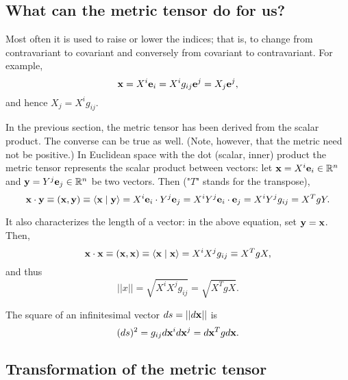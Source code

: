 \subsection{What can the metric tensor do for us?}

Most often it is used to raise or lower the indices; that is,
to change from contravariant to covariant and conversely from covariant
to contravariant.
{
\color{blue}
\bexample
For example,
\begin{equation}
{\bf x} =
X^i {\bf e}_i = X^i g_{ij} {\bf e}^j   = X_j {\bf e}^j,
\end{equation}
and hence $X_j = X^i g_{ij}$.
\eexample
}


In the previous section, the metric tensor has been derived from the scalar product.
The converse can be true as well.
(Note, however, that the metric need not be positive.)
In Euclidean space with the dot (scalar, inner) product
the metric tensor represents the scalar product between vectors: let
${\bf x}=X^i{\bf e}_i \in {\Bbb R}^n$ and ${\bf y}=Y^j{\bf e}_j \in {\Bbb R}^n$ be two vectors.
Then ("$T$" stands for the transpose),
\begin{equation}
{\bf x}\cdot {\bf y}\equiv ({\bf x},{\bf y})\equiv \langle {\bf x}\mid {\bf y}\rangle
= X^i {\bf e}_i\cdot Y^j {\bf e}_j
= X^iY^j {\bf e}_i\cdot  {\bf e}_j
=X^iY^j g_{ij}= X^T g Y.
\end{equation}

It also characterizes the length of a vector: in the above
equation, set ${\bf y}={\bf x}$. Then,
\begin{equation}
{\bf x}\cdot {\bf x}\equiv ({\bf x},{\bf x})\equiv \langle {\bf x}\mid {\bf x}\rangle
=X^iX^j g_{ij}\equiv X^T g X,
\end{equation}
and thus
\begin{equation}
\vert\vert  x\vert\vert  =\sqrt{X^iX^j g_{ij}}= \sqrt{X^T g X}.
\end{equation}


The square of an infinitesimal vector $ds =\vert\vert d{\bf x} \vert\vert $ is
\begin{equation}
(d s)^2  = g_{ij}d{\bf x}^id{\bf x}^j= d{\bf x}^T g d{\bf x}.
\end{equation}




\subsection{Transformation of the metric tensor}

